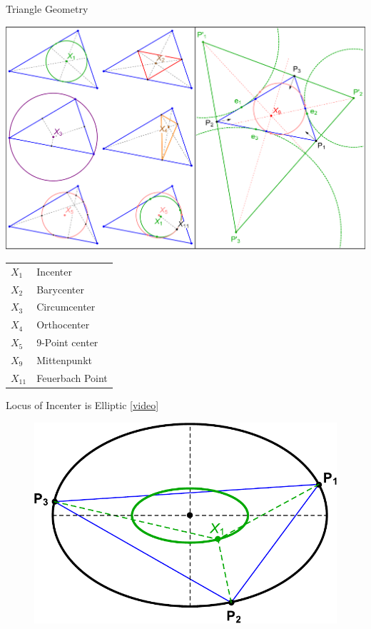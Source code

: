 \begin{frame}{Triangle Geometry}

\begin{minipage}[c]{0.85\textwidth}
\includegraphics[width=.85\textwidth]{pics/0039_constr.pdf}
\end{minipage}
\hspace{-1.5cm}
\begin{minipage}[c]{.2\textwidth}
\begin{table}
\tiny
\begin{tabular}{p{1em}l}
$X_1$ & Incenter \\
$X_2$ & Barycenter \\
$X_3$ & Circumcenter \\
$X_4$ & Orthocenter \\
$X_5$ & 9-Point center \\
$X_9$ & Mittenpunkt \\
$X_{11}$ & Feuerbach Point
\end{tabular}
\end{table}
\end{minipage}
\end{frame}

\begin{frame}{Locus of Incenter is Elliptic \href{https://www.youtube.com/watch?v=BBsyM7RnswA}{[video]}}
\begin{figure}
\includegraphics[height=.7\textheight]{pics/0020_incenter_locus.pdf}
\end{figure}
\end{frame}


